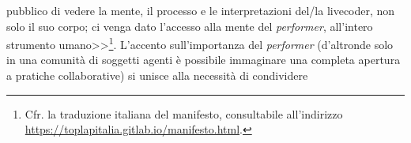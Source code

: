 \documentclass[a4paper,12pt]{scrartcl}
\begin{document}
pubblico di vedere la mente, il processo e le interpretazioni del/la livecoder, non solo il suo corpo; ci venga dato l'accesso alla mente del \emph{performer}, all'intero strumento umano>>\footnote{Cfr. la traduzione italiana del manifesto, consultabile all'indirizzo \url{https://toplapitalia.gitlab.io/manifesto.html}.}. L'accento sull'importanza del \emph{performer} (d'altronde solo in una comunità di soggetti agenti è possibile immaginare una completa apertura a pratiche collaborative) si unisce alla necessità di condividere 
	
	
	
\end{document}

